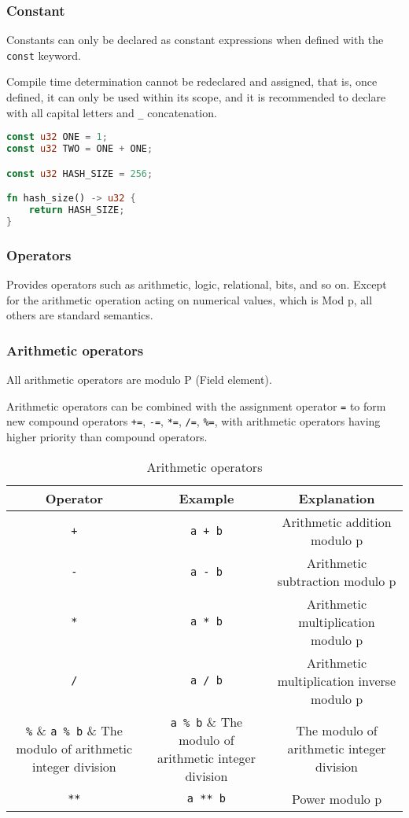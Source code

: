 \subsubsection{Constant}

Constants can only be declared as constant expressions when defined with the \texttt{const} keyword.

Compile time determination cannot be redeclared and assigned, that is, once defined, it can only be used within its scope, and it is recommended to declare with all capital letters and \texttt{\_} concatenation. 

\begin{lstlisting}[language=rust]
const u32 ONE = 1;
const u32 TWO = ONE + ONE;

const u32 HASH_SIZE = 256;

fn hash_size() -> u32 {
    return HASH_SIZE;
}
\end{lstlisting}

\subsubsection{Operators}

Provides operators such as arithmetic, logic, relational, bits, and so on. Except for the arithmetic operation acting on numerical values, which is Mod p, all others are standard semantics. 

\subsubsection*{Arithmetic operators}

All arithmetic operators are modulo P (Field element).

Arithmetic operators can be combined with the assignment operator \verb|=| to form new compound operators \verb|+=|, \verb|-=|, \verb|*=|, \verb|/=|, \verb|%=|, with arithmetic operators having higher priority than compound operators. 

\begin{table}
\centering
\begin{tabular}{c|c|c}
    Operator & Example & Explanation \\ \hline
    \verb|+| & \verb|a + b| & Arithmetic addition modulo p \\
    \verb|-| & \verb|a - b| & Arithmetic subtraction modulo p \\
    \verb|*| & \verb|a * b| & Arithmetic multiplication modulo p \\
    \verb|/| & \verb|a / b| & Arithmetic multiplication inverse modulo p \\
    \verb|%| & \verb|a % b| & The modulo of arithmetic integer division \\
    \verb|**| & \verb|a ** b| & Power modulo p \\
\end{tabular}
\caption{Arithmetic operators}
\end{table}

